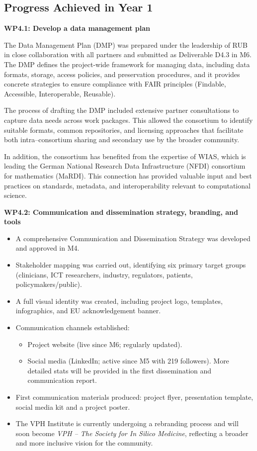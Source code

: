 \documentclass[a4paper,12pt, numbers]{article}
\begin{document}
\subsection{Progress Achieved in Year 1} %

\noindent\textbf{WP4.1: Develop a data management plan}

The Data Management Plan (DMP) was prepared under the leadership of RUB in close collaboration with all partners and submitted as Deliverable D4.3 in M6. The DMP defines the project-wide framework for managing data, including data formats, storage, access policies, and preservation procedures, and it provides concrete strategies to ensure compliance with FAIR principles (Findable, Accessible, Interoperable, Reusable).  

The process of drafting the DMP included extensive partner consultations to capture data needs across work packages. This allowed the consortium to identify suitable formats, common repositories, and licensing approaches that facilitate both intra--consortium sharing and secondary use by the broader community.  

In addition, the consortium has benefited from the expertise of WIAS, which is leading the German National Research Data Infrastructure (NFDI) consortium for mathematics (MaRDI). This connection has provided valuable input and best practices on standards, metadata, and interoperability relevant to computational science.  



\noindent\textbf{WP4.2: Communication and dissemination strategy, branding, and tools}

\begin{itemize}[left=1em, itemsep=0pt, topsep=0pt]
\item A comprehensive Communication and Dissemination Strategy was developed and approved in M4.
\item Stakeholder mapping was carried out, identifying six primary target groups (clinicians, ICT researchers, industry, regulators, patients, policymakers/public).
\item A full visual identity was created, including project logo, templates, infographics, and EU acknowledgement banner.
\item Communication channels established:
\begin{itemize}[left=1em, itemsep=0pt, topsep=0pt]
\item Project website (live since M6; regularly updated).
\item Social media (LinkedIn; active since M5 with 219 followers). More detailed stats will be provided in the first dissemination and communication report.
\end{itemize}
\item First communication materials produced: project flyer, presentation template, social media kit and a project poster.
\item The VPH Institute is currently undergoing a rebranding process and will soon become \textit{VPH – The Society for In Silico Medicine}, reflecting a broader and more inclusive vision for the community.
\end{itemize}
\end{document}
